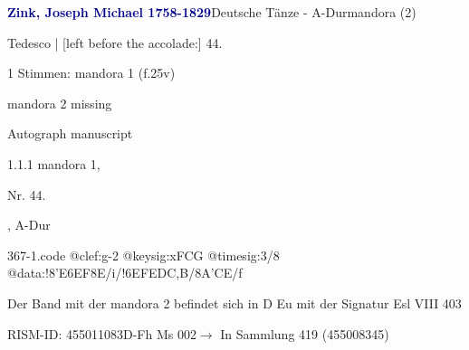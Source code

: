 \documentclass[twocolumn]{book}
\begin{document}
\par \vspace{7pt} \textcolor{darkblue}{\textbf{Zink, Joseph Michael  1758-1829}}\hfillplus{\textbf{[367]}}\newline Deutsche Tänze - A-Dur\newline mandora (2)
\par \begin{itshape}[f.25v, at left:] Tedesco | [left before the accolade:] 44.\end{itshape} 
\par \textcolor{darkblue}{}  1 Stimmen: mandora 1  (f.25v)\newline \begin{small} mandora 2 missing\end{small} \newline Autograph manuscript
\par 1.1.1  mandora 1, \begin{itshape}Nr. 44.\end{itshape}, A-Dur  
\begin{filecontents*}{367-1.code}
@clef:g-2
@keysig:xFCG
@timesig:3/8
@data:!{8'E6EF}8E/i/!{6EF}{ED}{C,B}/8A'CE/f
\end{filecontents*}
\newline
%
\par Der Band mit der mandora 2 befindet sich in D Eu mit der Signatur Esl VIII 403
\par RISM-ID: 455011083\newline D-Fh  Ms 002\newline $\rightarrow$ In Sammlung 419 (455008345)
      
\end{document}
